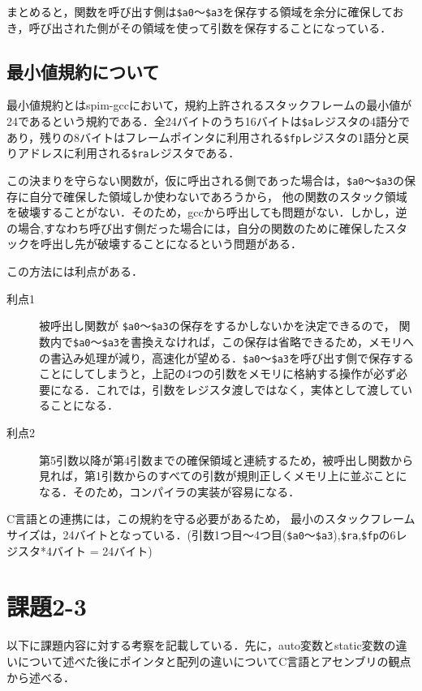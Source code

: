 \documentclass[a4j,11pt]{jarticle}
\begin{document}
まとめると，関数を呼び出す側は\verb|$a0|〜\verb|$a3|を保存する領域を余分に確保しておき，呼び出された側がその領域を使って引数を保存することになっている．

\subsection{最小値規約について}
最小値規約とはspim-gccにおいて，規約上許されるスタックフレームの最小値が24であるという規約である．全24バイトのうち16バイトは\verb|$a|レジスタの4語分であり，残りの8バイトはフレームポインタに利用される\verb|$fp|レジスタの1語分と戻りアドレスに利用される\verb|$ra|レジスタである．

この決まりを守らない関数が，仮に呼出される側であった場合は，\verb|$a0|〜\verb|$a3|の保存に自分で確保した領域しか使わないであろうから， 他の関数のスタック領域を破壊することがない．そのため，gccから呼出しても問題がない．しかし，逆の場合,すなわち呼び出す側だった場合には，自分の関数のために確保したスタックを呼出し先が破壊することになるという問題がある．

この方法には利点がある．
\begin{description}
\item[利点1]被呼出し関数が \verb|$a0|〜\verb|$a3|の保存をするかしないかを決定できるので， 関数内で\verb|$a0|〜\verb|$a3|を書換えなければ，この保存は省略できるため，メモリへの書込み処理が減り，高速化が望める．\verb|$a0|〜\verb|$a3|を呼び出す側で保存することにしてしまうと，上記の4つの引数をメモリに格納する操作が必ず必要になる．これでは，引数をレジスタ渡しではなく，実体として渡していることになる．
\item[利点2]第5引数以降が第4引数までの確保領域と連続するため，被呼出し関数から見れば，第1引数からのすべての引数が規則正しくメモリ上に並ぶことになる．そのため，コンパイラの実装が容易になる．
\end{description}
C言語との連携には，この規約を守る必要があるため， 最小のスタックフレームサイズは，24バイトとなっている．(引数1つ目〜4つ目(\verb|$a0|〜\verb|$a3|),\verb|$ra|,\verb|$fp|の6レジスタ*4バイト = 24バイト) 
 \section{課題2-3}
以下に課題内容に対する考察を記載している．先に，auto変数とstatic変数の違いについて述べた後にポインタと配列の違いについてC言語とアセンブリの観点から述べる．
\end{document}
